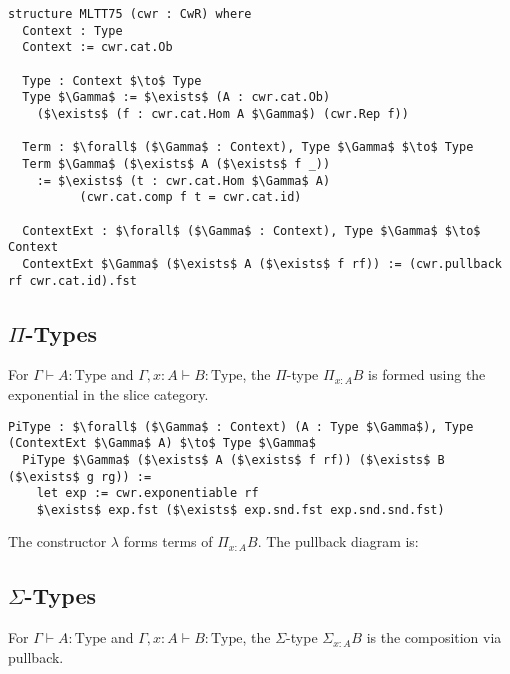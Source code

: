 \documentclass{article}
\theoremstyle{definition}
\begin{document}
\begin{lstlisting}[mathescape=true]
structure MLTT75 (cwr : CwR) where
  Context : Type
  Context := cwr.cat.Ob

  Type : Context $\to$ Type
  Type $\Gamma$ := $\exists$ (A : cwr.cat.Ob)
    ($\exists$ (f : cwr.cat.Hom A $\Gamma$) (cwr.Rep f))

  Term : $\forall$ ($\Gamma$ : Context), Type $\Gamma$ $\to$ Type
  Term $\Gamma$ ($\exists$ A ($\exists$ f _))
    := $\exists$ (t : cwr.cat.Hom $\Gamma$ A)
          (cwr.cat.comp f t = cwr.cat.id)

  ContextExt : $\forall$ ($\Gamma$ : Context), Type $\Gamma$ $\to$ Context
  ContextExt $\Gamma$ ($\exists$ A ($\exists$ f rf)) := (cwr.pullback rf cwr.cat.id).fst
\end{lstlisting}

\newpage
\subsection{$\Pi$-Types}
For $\Gamma \vdash A : \text{Type}$ and $\Gamma, x : A \vdash B : \text{Type}$, the $\Pi$-type $\Pi_{x : A} B$ is formed using the exponential in the slice category.

\begin{lstlisting}[mathescape=true]
  PiType : $\forall$ ($\Gamma$ : Context) (A : Type $\Gamma$), Type (ContextExt $\Gamma$ A) $\to$ Type $\Gamma$
  PiType $\Gamma$ ($\exists$ A ($\exists$ f rf)) ($\exists$ B ($\exists$ g rg)) :=
    let exp := cwr.exponentiable rf
    $\exists$ exp.fst ($\exists$ exp.snd.fst exp.snd.snd.fst)
\end{lstlisting}

The constructor $\lambda$ forms terms of $\Pi_{x : A} B$. The pullback diagram is:


\subsection{$\Sigma$-Types}
For $\Gamma \vdash A : \text{Type}$ and $\Gamma, x : A \vdash B : \text{Type}$, the $\Sigma$-type $\Sigma_{x : A} B$ is the composition via pullback.
\end{document}
